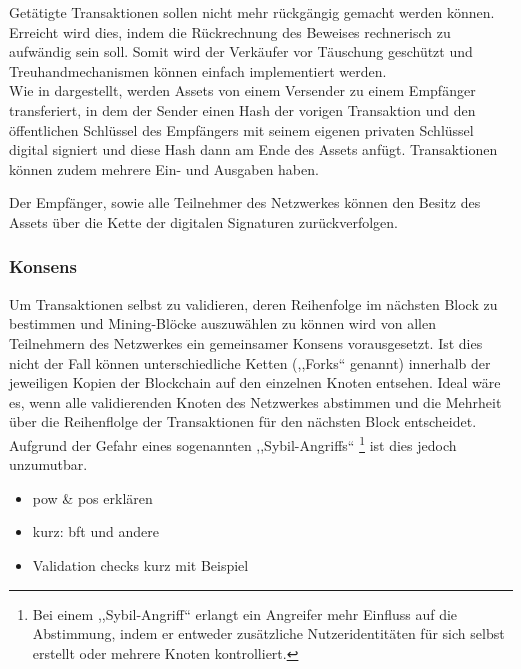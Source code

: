     
    Getätigte Transaktionen sollen nicht mehr rückgängig gemacht werden können.
    Erreicht wird dies, indem die Rückrechnung des Beweises rechnerisch zu aufwändig sein soll\cite{Nakamoto2008}.
    Somit wird der Verkäufer vor Täuschung geschützt und Treuhandmechanismen können einfach implementiert werden\cite{Nakamoto2008}.  
    \medskip\\
    Wie in  dargestellt, werden Assets von einem Versender zu einem Empfänger transferiert, in dem der Sender einen Hash der vorigen Transaktion und den öffentlichen Schlüssel des Empfängers mit seinem eigenen privaten Schlüssel digital signiert und diese Hash dann am Ende des Assets anfügt.
    Transaktionen können zudem mehrere Ein- und Ausgaben haben\cite{Nakamoto2008}.
    
    Der Empfänger, sowie alle Teilnehmer des Netzwerkes können den Besitz des Assets über die Kette der digitalen Signaturen zurückverfolgen\cite{Nakamoto2008}.
	    
    \subsubsection{Konsens}
    \label{sec:sota_blockchain_consensus}
        Um Transaktionen selbst zu validieren, deren Reihenfolge im nächsten Block zu bestimmen und Mining-Blöcke auszuwählen zu können wird von allen Teilnehmern des Netzwerkes ein gemeinsamer Konsens vorausgesetzt. 
        Ist dies nicht der Fall können unterschiedliche Ketten (,,Forks`` genannt) innerhalb der jeweiligen Kopien der Blockchain auf den einzelnen Knoten entsehen. 
        Ideal wäre es, wenn alle validierenden Knoten des Netzwerkes abstimmen und die Mehrheit über die Reihenflolge der Transaktionen für den nächsten Block entscheidet.\cite{Christidis2016} 
        Aufgrund der Gefahr eines sogenannten ,,Sybil-Angriffs``\cite{Trifa2014}
        \!\footnote{Bei einem ,,Sybil-Angriff`` erlangt ein Angreifer mehr Einfluss auf die Abstimmung, indem er entweder zusätzliche Nutzeridentitäten für sich selbst erstellt oder mehrere Knoten kontrolliert.
        } ist dies jedoch unzumutbar.\cite{Christidis2016}
        \begin{itemize}[noitemsep]
            \item \gls{pow} \& \gls{pos} erklären
            \item kurz: \gls{bft} und andere
            \item Validation checks kurz mit Beispiel
        \end{itemize}
    
